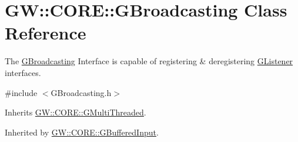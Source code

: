\hypertarget{class_g_w_1_1_c_o_r_e_1_1_g_broadcasting}{}\section{GW\+:\+:C\+O\+RE\+:\+:G\+Broadcasting Class Reference}
\label{class_g_w_1_1_c_o_r_e_1_1_g_broadcasting}


The \hyperlink{class_g_w_1_1_c_o_r_e_1_1_g_broadcasting}{G\+Broadcasting} Interface is capable of registering \& deregistering \hyperlink{class_g_w_1_1_c_o_r_e_1_1_g_listener}{G\+Listener} interfaces.  




{\ttfamily \#include $<$G\+Broadcasting.\+h$>$}



Inherits \hyperlink{class_g_w_1_1_c_o_r_e_1_1_g_multi_threaded}{G\+W\+::\+C\+O\+R\+E\+::\+G\+Multi\+Threaded}.



Inherited by \hyperlink{class_g_w_1_1_c_o_r_e_1_1_g_buffered_input}{G\+W\+::\+C\+O\+R\+E\+::\+G\+Buffered\+Input}.

